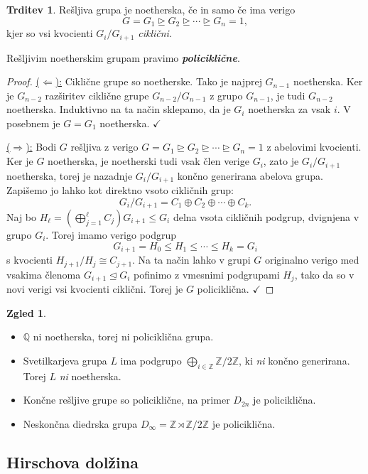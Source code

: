 \documentclass[11pt]{book}
\def\ZZ{\mathbb{Z}}
\def\QQ{\mathbb{Q}}
\def\definicija{\color{rdeca}\bf\em}
\def\kljuka{$\checkmark$}
\theoremstyle{definition}
\theoremstyle{zgled}
\newtheorem*{zgled}{Zgled}
\theoremstyle{odprtproblem}
\theoremstyle{domacanaloga}
\newenvironment{dokaz}
    {\color{siva}\begin{proof}}
    {\end{proof}}
\theoremstyle{izrek}
\newtheorem*{trditev}{Trditev}
\begin{document}
\begin{trditev}
Rešljiva grupa je noetherska, če in samo če ima verigo
\[
G = G_1 \unrhd G_2 \unrhd \cdots \unrhd G_n = 1,
\]
kjer so vsi kvocienti $G_i/G_{i+1}$ {\em ciklični}.
\end{trditev}

Rešljivim noetherskim grupam pravimo {\definicija policiklične}.

\begin{dokaz}
\underline{($\Leftarrow$):} Ciklične grupe so noetherske. Tako je najprej $G_{n-1}$ noetherska. Ker je $G_{n-2}$ razširitev ciklične grupe $G_{n-2}/G_{n-1}$ z grupo $G_{n-1}$, je tudi $G_{n-2}$ noetherska. Induktivno na ta način sklepamo, da je $G_i$ noetherska za vsak $i$. V posebnem je $G = G_1$ noetherska. \kljuka

\underline{($\Rightarrow$):} Bodi $G$ rešljiva z verigo $G = G_1 \unrhd G_2 \unrhd \cdots \unrhd G_n = 1$ z abelovimi kvocienti. Ker je $G$ noetherska, je noetherski tudi vsak člen verige $G_i$, zato je $G_i/G_{i+1}$ noetherska, torej je nazadnje $G_i/G_{i+1}$ končno generirana abelova grupa. Zapišemo jo lahko kot direktno vsoto cikličnih grup:
\[
G_i/G_{i+1} = C_1 \oplus C_2 \oplus \cdots \oplus C_k.
\]
Naj bo $H_\ell = \left( \bigoplus_{j = 1}^\ell C_j \right)G_{i+1} \leq G_i$ delna vsota cikličnih podgrup, dvignjena v grupo $G_i$. Torej imamo verigo podgrup
\[
G_{i+1} = H_0 \leq H_1 \leq \cdots \leq H_k = G_i
\]
s kvocienti $H_{j+1}/H_j \cong C_{j+1}$. Na ta način lahko v grupi $G$ originalno verigo med vsakima členoma $G_{i+1} \unlhd G_i$ pofinimo z vmesnimi podgrupami $H_j$, tako da so v novi verigi vsi kvocienti ciklični. Torej je $G$ policiklična. \kljuka
\end{dokaz}

\begin{zgled}
\begin{itemize}
    \item $\QQ$ ni noetherska, torej ni policiklična grupa.
    \item Svetilkarjeva grupa $L$ ima podgrupo $\bigoplus_{i \in \ZZ} \ZZ/2\ZZ$, ki {\em ni} končno generirana. Torej $L$ {\em ni} noetherska.
    \item Končne rešljive grupe so policiklične, na primer $D_{2n}$ je policiklična.
    \item Neskončna diedrska grupa $D_{\infty} = \ZZ \rtimes \ZZ/2\ZZ$ je policiklična.
\end{itemize}
\end{zgled}

\subsection{Hirschova dolžina}
\end{document}

